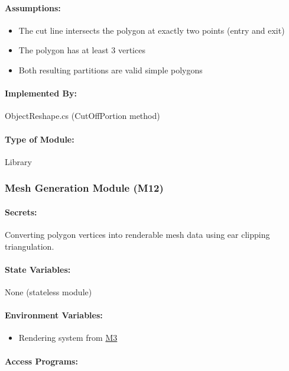\documentclass[12pt, titlepage]{article}
\begin{document}
\paragraph{Assumptions:}
\begin{itemize}
\item The cut line intersects the polygon at exactly two points (entry and exit)
\item The polygon has at least 3 vertices
\item Both resulting partitions are valid simple polygons
\end{itemize}

\paragraph{Implemented By:}
ObjectReshape.cs (CutOffPortion method)

\paragraph{Type of Module:}
Library

\vspace{10mm}

\subsubsection{Mesh Generation Module (M12)} \label{M12}

\paragraph{Secrets:}
Converting polygon vertices into renderable mesh data using ear clipping triangulation.

\paragraph{State Variables:}
None (stateless module)

\paragraph{Environment Variables:}
\begin{itemize}
\item Rendering system from \hyperref[M3]{M3}
\end{itemize}

\paragraph{Access Programs:}
\end{document}

